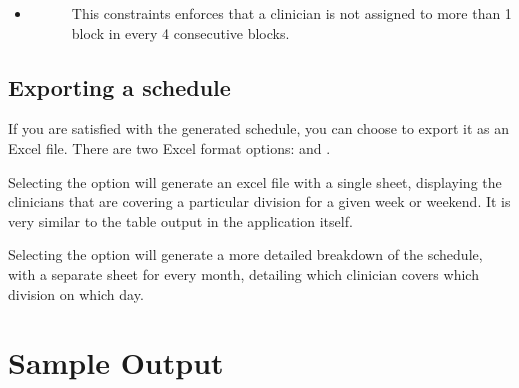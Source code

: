 \documentclass[letterpaper,10pt,english]{sphinxmanual}
\begin{document}
\begin{itemize}
\begin{description}
\end{description}

\item {} \begin{description}
\item[{}] \leavevmode
This constraints enforces that a clinician is not assigned to more than
1 block in every 4 consecutive blocks.

\end{description}

\end{itemize}


\section{Exporting a schedule}
\label{\detokenize{manual:exporting-a-schedule}}
If you are satisfied with the generated schedule, you can choose to export
it as an Excel file. There are two Excel format options:  and
.

Selecting the  option will generate an excel file with a single
sheet, displaying the clinicians that are covering a particular division
for a given week or weekend. It is very similar to the table output in
the application itself.

\begin{figure}[H]
\centering

\end{figure}

Selecting the  option will generate a more detailed breakdown
of the schedule, with a separate sheet for every month, detailing which
clinician covers which division on which day.

\begin{figure}[H]
\centering

\end{figure}


\chapter{Sample Output}
\label{\detokenize{manual:sample-output}}
\end{document}

